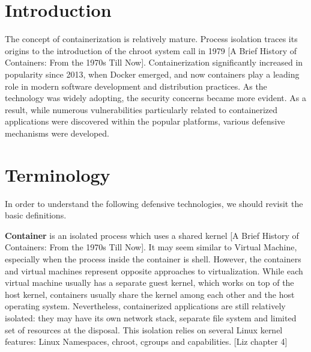 \section{Introduction}

The concept of containerization is relatively mature. Process isolation traces its origins to the introduction of the chroot system call in 1979 [A Brief History of Containers: From the 1970s Till Now]. Containerization significantly increased in popularity since 2013, when Docker emerged, and now containers play a leading role in modern software development and distribution practices. As the technology was widely adopting, the security concerns became more evident. As a result, while numerous vulnerabilities particularly related to containerized applications were discovered within the popular platforms, various defensive mechanisms were developed.

\section{Terminology}

In order to understand the following defensive technologies, we should revisit the basic definitions. 

\textbf{Container} is an isolated process which uses a shared kernel [A Brief History of Containers: From the 1970s Till Now]. It may seem similar to Virtual Machine, especially when the process inside the container is shell. However, the containers and virtual machines represent opposite approaches to virtualization. While each virtual machine usually has a separate guest kernel, which works on top of the host kernel, containers usually share the kernel among each other and the host operating system. Nevertheless, containerized applications are still relatively isolated: they may have its own network stack, separate file system and limited set of resources at the disposal. This isolation relies on several Linux kernel features: Linux Namespaces, chroot, cgroups and capabilities. [Liz chapter 4]

